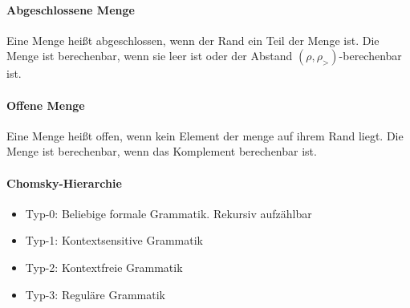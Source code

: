 \documentclass[ngerman]{scrartcl}
\begin{document}
\paragraph{Abgeschlossene Menge}
Eine Menge heißt abgeschlossen, wenn der Rand ein Teil der Menge ist. Die Menge ist berechenbar, wenn sie leer ist oder der Abstand $ (\rho, \rho_>) $-berechenbar ist.

\paragraph{Offene Menge}
Eine Menge heißt offen, wenn kein Element der menge auf ihrem Rand liegt. Die Menge ist berechenbar, wenn das Komplement berechenbar ist.
\paragraph{Chomsky-Hierarchie}
\begin{itemize}
  \item Typ-0: Beliebige formale Grammatik. Rekursiv aufzählbar
  \item Typ-1: Kontextsensitive Grammatik
  \item Typ-2: Kontextfreie Grammatik
  \item Typ-3: Reguläre Grammatik
\end{itemize}




%
%
%
%
\end{document}
